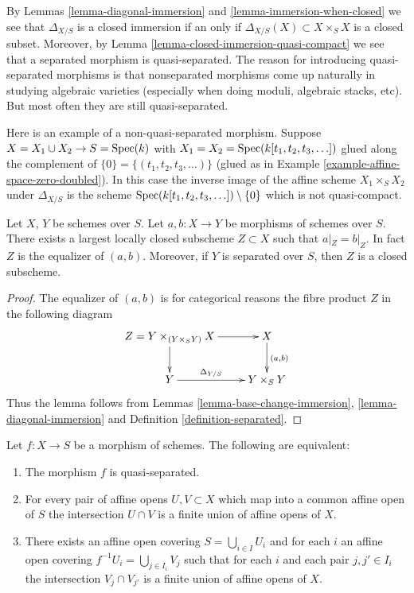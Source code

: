 \noindent
By Lemmas \ref{lemma-diagonal-immersion} and \ref{lemma-immersion-when-closed}
we see that $\Delta_{X/S}$ is a closed immersion if an only if
$\Delta_{X/S}(X) \subset X \times_S X$ is a closed subset. Moreover,
by Lemma \ref{lemma-closed-immersion-quasi-compact} we see that a
separated morphism is quasi-separated. The reason for introducing
quasi-separated morphisms is that nonseparated morphisms come up naturally
in studying algebraic varieties (especially when doing moduli,
algebraic stacks, etc). But most often they are still quasi-separated.

\begin{example}
\label{example-not-quasi-separated}
Here is an example of a non-quasi-separated morphism.
Suppose $X = X_1 \cup X_2 \to S = \mathop{\mathrm{Spec}}(k)$ with
$X_1 = X_2 = \mathop{\mathrm{Spec}}(k[t_1, t_2, t_3, \ldots])$
glued along the complement of $\{0\} = \{(t_1, t_2, t_3, \ldots)\}$
(glued as in Example \ref{example-affine-space-zero-doubled}).
In this case the inverse image of the affine scheme
$X_1 \times_S X_2$ under $\Delta_{X/S}$ is the scheme
$\mathop{\mathrm{Spec}}(k[t_1, t_2, t_3, \ldots]) \setminus \{0\}$
which is not quasi-compact.
\end{example}

\begin{lemma}
\label{lemma-where-are-they-equal}
Let $X$, $Y$ be schemes over $S$.
Let $a, b : X \to Y$ be morphisms of schemes over $S$.
There exists a largest locally closed subscheme
$Z \subset X$ such that $a|_Z = b|_Z$. In fact $Z$ is
the equalizer of $(a, b)$. Moreover, if $Y$ is separated
over $S$, then $Z$ is a closed subscheme.
\end{lemma}

\begin{proof}
The equalizer of $(a, b)$ is for categorical reasons
the fibre product $Z$ in the following diagram
$$
\xymatrix{
Z = Y \times_{(Y \times_S Y)} X \ar[r] \ar[d] &
 X \ar[d]^{(a , b)} \\
Y \ar[r]^-{\Delta_{Y/S}} & Y \times_S Y
}
$$
Thus the lemma follows from Lemmas
\ref{lemma-base-change-immersion}, \ref{lemma-diagonal-immersion} and
Definition \ref{definition-separated}.
\end{proof}

\begin{lemma}
\label{lemma-characterize-quasi-separated}
Let $f : X \to S$ be a morphism of schemes.
The following are equivalent:
\begin{enumerate}
\item The morphism $f$ is quasi-separated.
\item For every pair of affine opens $U, V \subset X$
which map into a common affine open of $S$ the intersection
$U \cap V$ is a finite union of affine opens of $X$.
\item There exists an affine open covering $S = \bigcup_{i \in I} U_i$
and for each $i$ an affine open covering $f^{-1}U_i = \bigcup_{j \in I_i} V_j$
such that for each $i$ and each pair $j, j' \in I_i$ the
intersection $V_j \cap V_{j'}$ is a finite union of affine
opens of $X$.
\end{enumerate}
\end{lemma}


